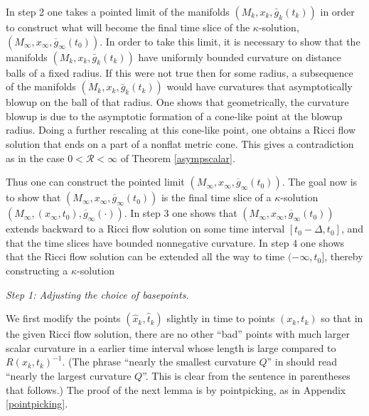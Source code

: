 In step 2 one takes a pointed limit of the manifolds
$(M_k, x_k,\bar g_k(t_k))$ in order to construct what
will become the final time slice of the $\kappa$-solution,
$(M_\infty, x_\infty, \overline{g}_\infty(t_0))$. In order to take this
limit, it is necessary to show that the manifolds
$(M_k, x_k,\bar g_k(t_k))$ have uniformly bounded curvature on distance
balls of a fixed radius.  If this were not true then for some radius,
a subsequence of the
manifolds $(M_k, x_k,\bar g_k(t_k))$ would have curvatures that
asymptotically blowup on the ball of that radius.  One shows that
geometrically, the curvature blowup is due to the asymptotic formation of
a cone-like point at the blowup radius.  Doing a further
rescaling at this cone-like point, one obtains a Ricci flow solution
that ends on a part of a nonflat metric cone. This gives a contradiction
as in the case $0 < {\mathcal R} < \infty$ of Theorem \ref{asympscalar}.

Thus one can construct the pointed limit
$(M_\infty, x_\infty, \overline{g}_\infty(t_0))$. The goal now is
to show that $(M_\infty, x_\infty, \overline{g}_\infty(t_0))$ is the
final time slice of a $\kappa$-solution
$(M_\infty, (x_\infty, t_0), \overline{g}_\infty(\cdot))$. In step 3
one shows that $(M_\infty, x_\infty, \overline{g}_\infty(t_0))$ extends
backward
to a Ricci flow solution on some time interval $[t_0 - \Delta, t_0]$,
and that
the time slices have bounded nonnegative curvature.  In step 4 one
shows that the Ricci flow solution can be extended all the way to time
$(-\infty, t_0]$, thereby constructing a $\kappa$-solution

\bigskip
{\em Step 1: Adjusting the choice of basepoints.}

We first modify the points
$(\widehat{x}_k, \widehat{t}_k)$ slightly in time
to points $(x_k, t_k)$
so that in the given Ricci flow solution, there are no other ``bad'' points with
much larger scalar curvature in
a earlier time interval whose length is large compared to
$R(x_k, t_k)^{-1}$.
(The phrase ``nearly the smallest curvature $Q$'' in
\cite[Proof of Theorem 12.1]{Perelman} should read
``nearly the largest curvature $Q$''. This is clear from
the sentence in parentheses that follows.) The proof of
the next lemma is by pointpicking, as in Appendix \ref{pointpicking}.

